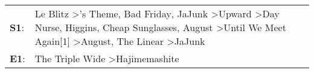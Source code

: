 \begin{supertabular}{p{0.03\textwidth}p{0.92\textwidth}}
 \textbf{S1}:  &  Le Blitz\textsuperscript{} \textgreater {}'s Theme\textsuperscript{}, \enspace Bad Friday\textsuperscript{}, \enspace JaJunk\textsuperscript{} \textgreater \enspace Upward\textsuperscript{} \textgreater \enspace Day Nurse\textsuperscript{}, \enspace Higgins\textsuperscript{}, \enspace Cheap Sunglasses\textsuperscript{}, \enspace August\textsuperscript{} \textgreater \enspace Until We Meet Again[1]\textsuperscript{} \textgreater \enspace August\textsuperscript{}, \enspace The Linear\textsuperscript{} \textgreater \enspace JaJunk\textsuperscript{}  \enspace  \\
 \textbf{E1}:  &                                                                                                                                                                                                                                                                                                                                                                                                                                                                                           The Triple Wide\textsuperscript{} \textgreater \enspace Hajimemashite\textsuperscript{}  \enspace  \\
\end{supertabular}
